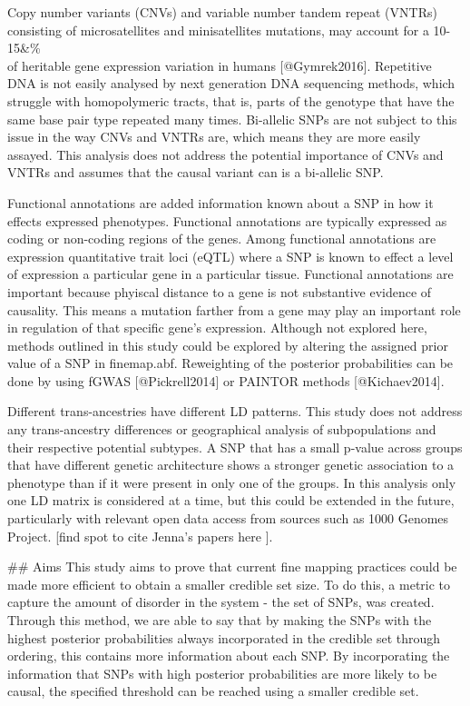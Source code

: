 Copy number variants (CNVs) and variable number tandem repeat (VNTRs) consisting of microsatellites and minisatellites mutations, may account for a 10-15&\% \\ of heritable gene expression variation in humans [@Gymrek2016]. Repetitive DNA is not easily analysed by next generation DNA sequencing methods, which struggle with homopolymeric tracts, that is, parts of the genotype that have the same base pair type repeated many times. Bi-allelic SNPs are not subject to this issue in the way CNVs and VNTRs are, which means they are more easily assayed. This analysis does not address the potential importance of CNVs and VNTRs and assumes that the causal variant can is a bi-allelic SNP. 

Functional annotations are added information known about a SNP in how it effects expressed phenotypes. Functional annotations are typically expressed as coding or non-coding regions of the genes. Among functional annotations are expression quantitative trait loci (eQTL) where a SNP is known to effect a level of expression a particular gene in a particular tissue. Functional annotations are important because phyiscal distance to a gene is not substantive evidence of causality. This means a mutation farther from a gene may play an important role in regulation of that specific gene's expression. 
Although not explored here, methods outlined in this study could be explored by altering the assigned prior value of a SNP in finemap.abf. Reweighting of the posterior probabilities can be done by using fGWAS [@Pickrell2014] or PAINTOR methods [@Kichaev2014]. 

Different trans-ancestries have different LD patterns. This study does not address any trans-ancestry differences or geographical analysis of subpopulations and their respective potential subtypes.  A SNP that has a small p-value across groups that have different genetic architecture shows a stronger genetic association to a phenotype than if it were present in only one of the groups. In this analysis only one LD matrix is considered at a time, but this could be extended in the future, particularly with relevant open data access from sources such as 1000 Genomes Project. [find spot to cite Jenna's papers here ]. 

## Aims 
This study aims to prove that current fine mapping practices could be made more efficient to obtain a smaller credible set size. To do this, a metric to capture the amount of disorder in the system - the set of SNPs, was created. Through this method, we are able to say that by making the SNPs with the highest posterior probabilities always incorporated in the credible set through ordering, this contains more information about each SNP. By incorporating the information that SNPs with high posterior probabilities are more likely to be causal, the specified threshold can be reached using a smaller credible set.

